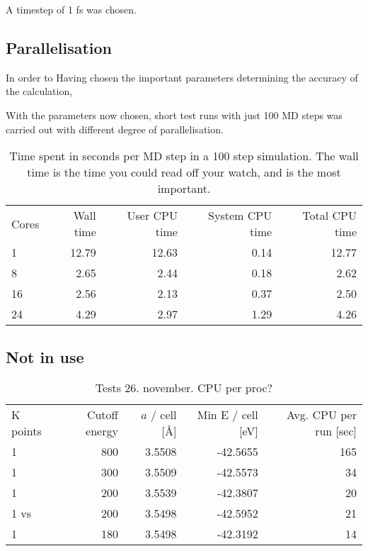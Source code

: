 \documentclass[11pt,bibliography=totoc,index=totoc]{scrbook}   %
\begin{document}
A timestep of 1 fs was chosen.

\cite{Richie:2004}


\subsection{Parallelisation}

In order to 
Having chosen the important parameters determining the accuracy of the calculation, 

With the parameters now chosen, short test runs with just 100 MD steps was carried out with different degree of parallelisation.


\begin{table}[htbp]
  \centering
  \begin{tabular}{lrrrr}
    Cores & Wall time & User CPU time & System CPU time & Total CPU time \\
    1     & 12.79 & 12.63 & 0.14 & 12.77 \\
    8     & 2.65 & 2.44 & 0.18 & 2.62 \\
    16    & 2.56 & 2.13 & 0.37 & 2.50 \\
    24    & 4.29 & 2.97 & 1.29 & 4.26 \\
  \end{tabular}
  \caption{Time spent in seconds per MD step in a 100 step simulation. The wall time is the time you could read off your watch, and is the most important.}
  \label{tab:}
\end{table}


\subsection{Not in use}

\begin{table}[htbp]
  \centering
  \begin{tabular}{lrrrr}
    K points    & Cutoff energy & $a$ / cell [\AA]   & Min E / cell [eV] & Avg. CPU per run [sec]      \\
    1           & 800           & 3.5508             & -42.5655          & 165      \\
    1           & 300           & 3.5509             & -42.5573          & 34       \\
    1           & 200           & 3.5539             & -42.3807          & 20       \\
    1 vs        & 200           & 3.5498             & -42.5952          & 21       \\
    1           & 180           & 3.5498             & -42.3192          & 14       \\
  \end{tabular}
  \caption{Tests 26. november. CPU per proc?}
\end{table}
\end{document}
